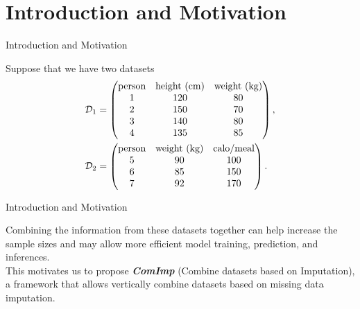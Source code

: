 \documentclass[xcolor={dvipsnames}]{beamer} %
\begin{document}
\section{Introduction and Motivation}
\begin{frame}{Introduction and Motivation}
    \begin{exam}
        Suppose that we have two datasets
\begin{align*}\label{eq1}
\small
    \mathcal{D}_1 &= \begin{pmatrix}
    \text{person} &\text{height (cm)} & \text{weight (kg)}  \\
    1 & 120 & 80 \\
    2 & 150 & 70 \\
    3 & 140 & 80 \\
    4 & 135 & 85 
    \end{pmatrix},\\
    \mathcal{D}_2 &= \begin{pmatrix}
    \text{person} & \text{weight (kg)} & \text{calo/meal}\\
    5 & 90 & 100  \\
    6 & 85 & 150 \\
    7 & 92 & 170 
    \end{pmatrix}.
\end{align*}        
    \end{exam}
\end{frame}

\begin{frame}{Introduction and Motivation}
\begin{moti}
Combining the information from these datasets together can help increase the sample sizes and may allow more efficient model training, prediction, and inferences. \\

This motivates us to propose \textbf{\textit{ComImp}} (Combine datasets based on Imputation), a framework that allows vertically combine datasets based on missing data imputation.
\end{moti}
\end{frame}
\end{document}

